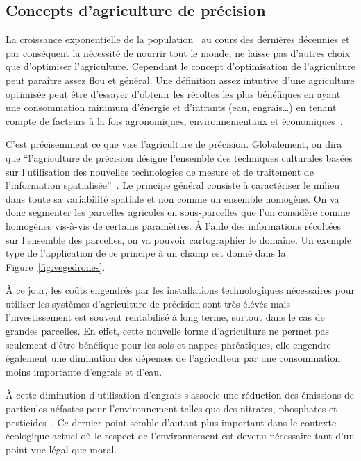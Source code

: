 \subsection{Concepts d'agriculture de précision}
La croissance exponentielle de la population~\cite{wiki:popu_mondiale}
au cours des dernières décennies et par conséquent la nécessité de nourrir
tout le monde, ne laisse pas d'autres choix que d'optimiser l'agriculture.
Cependant le concept d'optimisation de l'agriculture peut 
paraître assez flou et général.
Une définition assez intuitive d'une agriculture optimisée
peut être d'essayer d'obtenir
les récoltes les plus bénéfiques en ayant une consommation minimum d'énergie
et d'intrants (eau, engrais\dots) en tenant compte de facteurs à la fois
agronomiques, environnementaux et économiques~\cite{wiki:agri_prec}.

C'est précisemment ce que vise l'agriculture de précision.
Globalement, on dira que \enquote{l'agriculture de précision désigne
l'ensemble des techniques culturales basées sur l'utilisation
des nouvelles technologies de mesure et de traitement de l'information
spatialisée}~\cite{jullien2005agriculture}.
Le principe général consiste à caractériser le milieu dans toute sa
variabilité spatiale et non comme un ensemble homogène.
On va donc segmenter les parcelles agricoles en sous-parcelles
que l'on considère comme homogènes vis-à-vis de certains paramètres.
À l'aide des informations récoltées sur l'ensemble des parcelles,
on va pouvoir cartographier le domaine.
Un exemple type de l'application de ce principe à un champ
est donné dans la Figure~\ref{fig:vegedrones}.

À ce jour, les coûts engendrés par les installations technologiques
nécessaires pour utiliser les systèmes d'agriculture de précision
sont très élévés
mais l'investissement est souvent rentabilisé à long terme, surtout 
dans le cas de grandes parcelles.
En effet, cette nouvelle forme d'agriculture ne permet pas seulement
d'être bénéfique pour les sols et nappes phréatiques,
elle engendre également une diminution des dépenses de l'agriculteur
par une consommation moins importante d'engrais et d'eau.

À cette diminution d'utilisation d'engrais s'associe une réduction
des émissions de particules néfastes pour l'environnement telles que des nitrates, phosphates
et pesticides~\cite{emission_agri_particules}.
Ce dernier point semble d'autant plus important dans le contexte
écologique actuel où le respect de l'environnement est devenu nécessaire
tant d'un point vue légal que moral.

